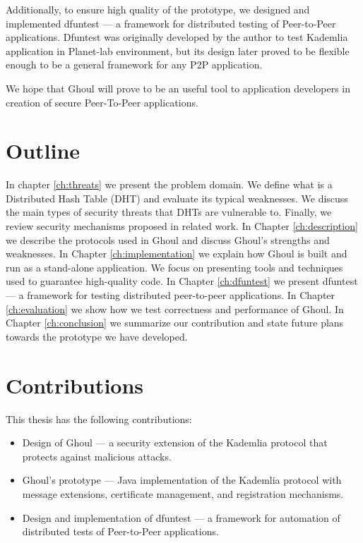 Additionally, to ensure high quality of the prototype, we designed and
implemented dfuntest --- a framework for distributed testing of Peer-to-Peer
applications.
Dfuntest was originally developed by the author to test Kademlia application in
Planet-lab environment, but its design later proved to be flexible enough to be
a general framework for any P2P application.

We hope that Ghoul will prove to be an useful tool to application developers in
creation of secure Peer-To-Peer applications.

\section{Outline}
In chapter \ref{ch:threats} we present the problem domain.
We define what is a Distributed Hash Table (DHT) and evaluate its typical
weaknesses.
We discuss the main types of security threats that DHTs are vulnerable to.
Finally, we review security mechanisms proposed in related work.
In Chapter \ref{ch:description} we describe the protocols used in Ghoul and
discuss Ghoul's strengths and weaknesses.
In Chapter \ref{ch:implementation} we explain how Ghoul is built and run as a
stand-alone application.
We focus on presenting tools and techniques used to guarantee high-quality code.
In Chapter \ref{ch:dfuntest} we present dfuntest --- a framework for testing
distributed peer-to-peer applications.
In Chapter \ref{ch:evaluation} we show how we test correctness and
performance of Ghoul.
In Chapter \ref{ch:conclusion} we summarize our contribution and state future
plans towards the prototype we have developed.

\section{Contributions}
This thesis has the following contributions:
\begin{itemize}
  \item Design of Ghoul --- a security extension of the Kademlia protocol that
    protects against malicious attacks.
  \item Ghoul's prototype --- Java implementation of the Kademlia protocol with
    message extensions, certificate management, and registration mechanisms.
  \item Design and implementation of dfuntest --- a framework for automation of
    distributed tests of Peer-to-Peer applications.
\end{itemize}
